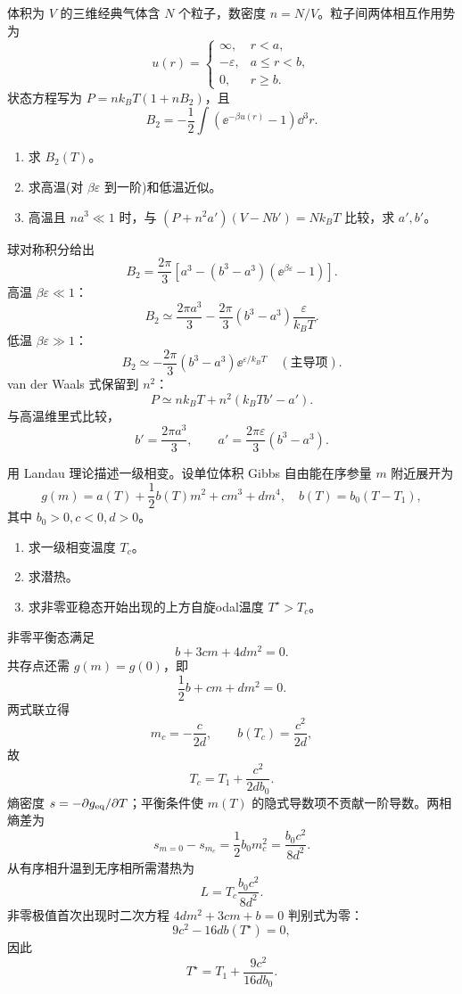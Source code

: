 \begin{question}
体积为 $V$ 的三维经典气体含 $N$ 个粒子，数密度 $n=N/V$。粒子间两体相互作用势为
\[u(r)=\begin{cases}\infty,&r<a,\\-\varepsilon,&a\le r<b,\\0,&r\ge b.\end{cases}\]
状态方程写为 $P=nk_BT(1+nB_2)$，且
\[B_2=-\frac12\int(\ee^{-\beta u(r)}-1)\dd^3r.\]
\begin{enumerate}
\item 求 $B_2(T)$。
\item 求高温(对 $\beta\varepsilon$ 到一阶)和低温近似。
\item 高温且 $na^3\ll1$ 时，与 $(P+n^2a')(V-Nb')=Nk_BT$ 比较，求 $a',b'$。
\end{enumerate}
\begin{solution}
球对称积分给出
\[\boxed{B_2=\frac{2\pi}{3}\left[a^3-(b^3-a^3)(\ee^{\beta\varepsilon}-1)\right]}.\]
高温 $\beta\varepsilon\ll1$：
\[\boxed{B_2\simeq\frac{2\pi a^3}{3}-\frac{2\pi}{3}(b^3-a^3)\frac{\varepsilon}{k_BT}}.\]
低温 $\beta\varepsilon\gg1$：
\[B_2\simeq-\frac{2\pi}{3}(b^3-a^3)\ee^{\varepsilon/k_BT}\quad(\text{主导项}).\]
van der Waals 式保留到 $n^2$：
\[P\simeq nk_BT+n^2(k_BT b'-a').\]
与高温维里式比较，
\[\boxed{b'=\frac{2\pi a^3}{3}},\qquad \boxed{a'=\frac{2\pi\varepsilon}{3}(b^3-a^3)}.\]
\end{solution}
\end{question}

\begin{question}
用 Landau 理论描述一级相变。设单位体积 Gibbs 自由能在序参量 $m$ 附近展开为
\[g(m)=a(T)+\frac12b(T)m^2+cm^3+dm^4,\quad b(T)=b_0(T-T_1),\]
其中 $b_0>0,c<0,d>0$。
\begin{enumerate}
\item 求一级相变温度 $T_c$。
\item 求潜热。
\item 求非零亚稳态开始出现的上方自旋odal温度 $T^\star>T_c$。
\end{enumerate}
\begin{solution}
非零平衡态满足
\[b+3cm+4dm^2=0.\]
共存点还需 $g(m)=g(0)$，即
\[\frac12b+cm+dm^2=0.\]
两式联立得
\[m_c=-\frac{c}{2d},\qquad b(T_c)=\frac{c^2}{2d},\]
故
\[\boxed{T_c=T_1+\frac{c^2}{2db_0}}.\]
熵密度 $s=-\partial g_{\rm eq}/\partial T$；平衡条件使 $m(T)$ 的隐式导数项不贡献一阶导数。两相熵差为
\[s_{m=0}-s_{m_c}=\frac12b_0m_c^2=\frac{b_0c^2}{8d^2}.\]
从有序相升温到无序相所需潜热为
\[\boxed{L=T_c\frac{b_0c^2}{8d^2}}.\]
非零极值首次出现时二次方程 $4dm^2+3cm+b=0$ 判别式为零：
\[9c^2-16db(T^\star)=0,\]
因此
\[\boxed{T^\star=T_1+\frac{9c^2}{16db_0}}.\]
\end{solution}
\end{question}

